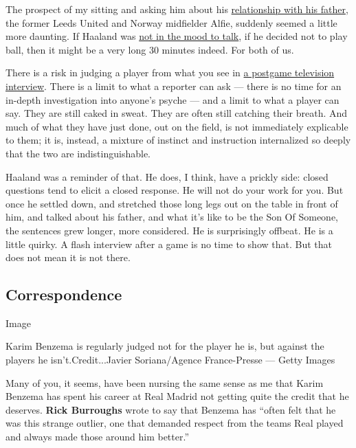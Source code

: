 The prospect of my sitting and asking him about his
\href{https://www.nytimes.com/2020/07/28/sports/soccer/erling-haaland-gio-reyna-thuram.html}{relationship
with his father}, the former Leeds United and Norway midfielder Alfie,
suddenly seemed a little more daunting. If Haaland was
\href{https://twitter.com/BBCSport/status/1263571516546969601}{not in
the mood to talk}, if he decided not to play ball, then it might be a
very long 30 minutes indeed. For both of us.

There is a risk in judging a player from what you see in
\href{https://www.youtube.com/watch?v=nqKH-_VzufQ\&feature=youtu.be}{a
postgame television interview}. There is a limit to what a reporter can
ask --- there is no time for an in-depth investigation into anyone's
psyche --- and a limit to what a player can say. They are still caked in
sweat. They are often still catching their breath. And much of what they
have just done, out on the field, is not immediately explicable to them;
it is, instead, a mixture of instinct and instruction internalized so
deeply that the two are indistinguishable.

Haaland was a reminder of that. He does, I think, have a prickly side:
closed questions tend to elicit a closed response. He will not do your
work for you. But once he settled down, and stretched those long legs
out on the table in front of him, and talked about his father, and what
it's like to be the Son Of Someone, the sentences grew longer, more
considered. He is surprisingly offbeat. He is a little quirky. A flash
interview after a game is no time to show that. But that does not mean
it is not there.

\hypertarget{correspondence}{%
\subsection{Correspondence}\label{correspondence}}

Image

Karim Benzema is regularly judged not for the player he is, but against
the players he isn't.Credit...Javier Soriana/Agence France-Presse ---
Getty Images

Many of you, it seems, have been nursing the same sense as me that Karim
Benzema has spent his career at Real Madrid not getting quite the credit
that he deserves. \textbf{Rick Burroughs} wrote to say that Benzema has
``often felt that he was this strange outlier, one that demanded respect
from the teams Real played and always made those around him better.''

